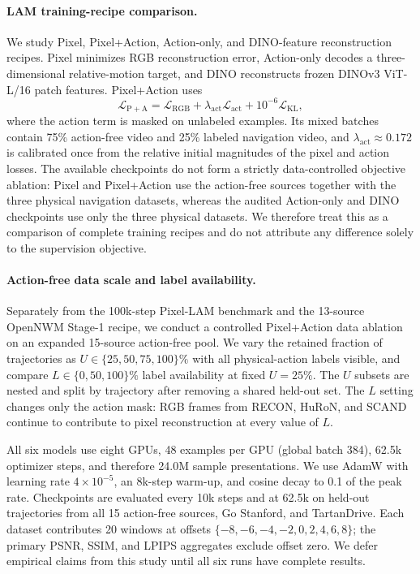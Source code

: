 \paragraph{LAM training-recipe comparison.}
We study Pixel, Pixel+Action, Action-only, and DINO-feature reconstruction
recipes.  Pixel minimizes RGB reconstruction error, Action-only decodes a
three-dimensional relative-motion target, and DINO reconstructs frozen DINOv3
ViT-L/16 patch features.  Pixel+Action uses
\begin{equation}
    \mathcal{L}_{\mathrm{P+A}}
    = \mathcal{L}_{\mathrm{RGB}}
    + \lambda_{\mathrm{act}}\mathcal{L}_{\mathrm{act}}
    + 10^{-6}\mathcal{L}_{\mathrm{KL}},
\end{equation}
where the action term is masked on unlabeled examples.  Its mixed batches
contain 75\% action-free video and 25\% labeled navigation video, and
$\lambda_{\mathrm{act}}\approx0.172$ is calibrated once from the relative
initial magnitudes of the pixel and action losses.  The available checkpoints
do not form a strictly data-controlled objective ablation: Pixel and
Pixel+Action use the action-free sources together with the three physical
navigation datasets, whereas the audited Action-only and DINO checkpoints use
only the three physical datasets.  We therefore treat this as a comparison of
complete training recipes and do not attribute any difference solely to the
supervision objective.

\paragraph{Action-free data scale and label availability.}
Separately from the 100k-step Pixel-LAM benchmark and the 13-source OpenNWM
Stage-1 recipe, we conduct a controlled Pixel+Action data ablation on an
expanded 15-source action-free pool.  We vary the retained fraction of
trajectories as
$U\in\{25,50,75,100\}\%$ with all physical-action labels visible, and compare
$L\in\{0,50,100\}\%$ label availability at fixed $U=25\%$.  The $U$ subsets
are nested and split by trajectory after removing a shared held-out set.  The
$L$ setting changes only the action mask: RGB frames from RECON, HuRoN,
and SCAND continue to contribute to pixel reconstruction at every value of
$L$.

All six models use eight GPUs, 48 examples per GPU (global batch 384), 62.5k
optimizer steps, and therefore 24.0M sample presentations.  We use AdamW with
learning rate $4\times10^{-5}$, an 8k-step warm-up, and cosine decay to 0.1 of
the peak rate.  Checkpoints are evaluated every 10k steps and at 62.5k on
held-out trajectories from all 15 action-free sources, Go Stanford, and
TartanDrive.  Each dataset contributes 20 windows at offsets
$\{-8,-6,-4,-2,0,2,4,6,8\}$; the primary PSNR, SSIM, and LPIPS aggregates
exclude offset zero.  We defer empirical claims from this study until all six
runs have complete results.
